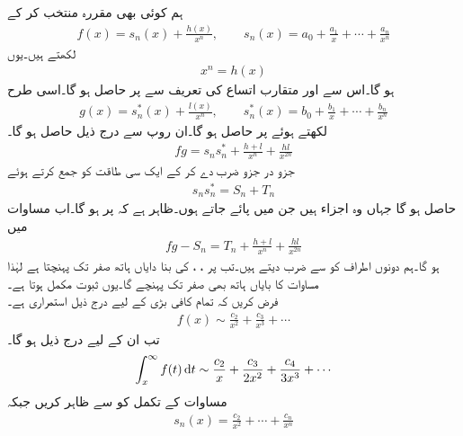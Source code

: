 ہم  کوئی بھی مقررہ  منتخب کر کے
\begin{align*}
f(x)=s_n(x)+\frac{h(x)}{x^n}, \qquad s_n(x)=a_0+\frac{a_1}{x}+\cdots+\frac{a_n}{x^n}
\end{align*}
لکھتے ہیں۔یوں
\begin{align*}
[f(x)-s_n(x)]x^n=h(x)
\end{align*}
ہو گا۔اس سے اور متقارب اتساع کی تعریف سے  پر  حاصل ہو گا۔اسی طرح
\begin{align*}
g(x)=s^*_n(x)+\frac{l(x)}{x^n}, \qquad s^*_n(x)=b_0+\frac{b_1}{x}+\cdots+\frac{b_n}{x^n}
\end{align*}
لکھتے ہوئے  پر  حاصل ہو گا۔ان روپ سے درج ذیل حاصل ہو گا۔
\begin{align*}
fg=s_ns^*_n+\frac{h+l}{x^n}+\frac{hl}{x^{2n}}
\end{align*}
جزو در جزو ضرب دے کر  کے ایک سی طاقت کو جمع کرتے ہوئے
\begin{align*}
s_ns^*_n=S_n+T_n
\end{align*}
حاصل ہو گا جہاں  وہ اجزاء ہیں جن میں  پائے جاتے ہوں۔ظاہر ہے کہ  پر  ہو گا۔اب مساوات  میں 
\begin{align*}
fg-S_n=T_n+\frac{h+l}{x^n}+\frac{hl}{x^{2n}}
\end{align*}
ہو گا۔ہم دونوں اطراف کو  سے ضرب دیتے ہیں۔تب  پر ، ،  کی بنا دایاں ہاتھ صفر تک پہنچتا ہے لہٰذا مساوات  کا بایاں ہاتھ بھی صفر تک پہنچے گا۔یوں ثبوت مکمل ہوتا ہے۔
\quad {}\\
فرض کریں کہ تمام کافی بڑی  کے لیے درج ذیل  استمراری ہے۔
\begin{align*}
f(x)\sim \frac{c_2}{x^2}+\frac{c_3}{x^3}+\cdots
\end{align*}
تب ان  کے لیے درج ذیل ہو گا۔
\begin{align}\label{مساوات_اعدادی_جزو_در_جزو_تکمل_الف}
\int_{x}^{\infty} f(t)\dif t\sim \frac{c_2}{x}+\frac{c_3}{2x^2}+\frac{c_4}{3x^3}+\cdots
\end{align}
\quad
مساوات  کے تکمل کو  سے ظاہر کریں جبکہ 
\begin{align*}
s_n(x)=\frac{c_2}{x^2}+\cdots+\frac{c_n}{x^n}
\end{align*}
